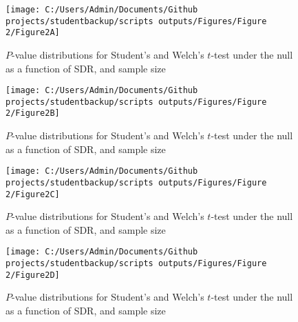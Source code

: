 \documentclass[
  english,
  man]{apa6}
\begin{document}
\begin{figure}

{\centering \texttt{[image: C:/Users/Admin/Documents/Github projects/studentbackup/scripts outputs/Figures/Figure 2/Figure2A]} 

}

\caption{$P$-value distributions for Student's and Welch's $t$-test under the null as a function of SDR, and sample size}\label{fig:chp2fig2-1}
\end{figure}
\begin{figure}

{\centering \texttt{[image: C:/Users/Admin/Documents/Github projects/studentbackup/scripts outputs/Figures/Figure 2/Figure2B]} 

}

\caption{$P$-value distributions for Student's and Welch's $t$-test under the null as a function of SDR, and sample size}\label{fig:chp2fig2-2}
\end{figure}
\begin{figure}

{\centering \texttt{[image: C:/Users/Admin/Documents/Github projects/studentbackup/scripts outputs/Figures/Figure 2/Figure2C]} 

}

\caption{$P$-value distributions for Student's and Welch's $t$-test under the null as a function of SDR, and sample size}\label{fig:chp2fig2-3}
\end{figure}
\begin{figure}

{\centering \texttt{[image: C:/Users/Admin/Documents/Github projects/studentbackup/scripts outputs/Figures/Figure 2/Figure2D]} 

}

\caption{$P$-value distributions for Student's and Welch's $t$-test under the null as a function of SDR, and sample size}\label{fig:chp2fig2-4}
\end{figure}
\end{document}
